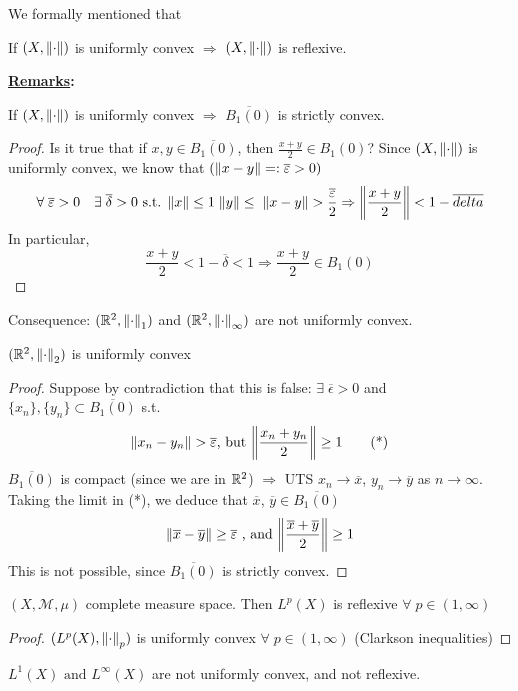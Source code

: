 We formally mentioned that
\begin{theorem}
    If \((X, \norm{\cdot})\) is uniformly convex \(\Rightarrow\) \((X, \norm{\cdot})\) is reflexive.
\end{theorem}

\noindent\textbf{\underline{Remarks}:}
    \begin{proposition}
        If \((X, \norm{\cdot})\) is uniformly convex \(\Rightarrow\) \(\overline{B_1(0)}\) is strictly convex.
    \end{proposition}
    \begin{proof}
        Is it true that if \(x, y \in \overline{B_1(0)}\), then \(\frac{x+y}{2} \in B_1(0)\)? Since \((X, \norm{\cdot})\) is uniformly convex, we know that \((\norm{x-y}=: \overline{\varepsilon}>0)\)
        \[
            \forall \; \overline{\varepsilon}>0 \quad \exists \; \overline{\delta} >0 \text{ s.t. } \norm{x} \leq 1 \; \norm{y} \leq \; \norm{x-y} > \frac{\overline{\varepsilon}}{2} \Rightarrow \norm{\frac{x+y}{2}} < 1-\overline{delta} 
        \]
        In particular, 
        \[
            \frac{x+y}{2} < 1-\overline{\delta} < 1 \Rightarrow \frac{x+y}{2} \in B_1(0)
        \] 
    \end{proof}
    Consequence: \((\mathbb{R}^2, \norm{\cdot}_1)\) and \((\mathbb{R}^2, \norm{\cdot}_\infty)\) are not uniformly convex.
\begin{proposition}
    \((\mathbb{R}^2, \norm{\cdot}_2)\) is uniformly convex
\end{proposition}
\begin{proof}
    Suppose by contradiction that this is false:
    \( \exists \; \overline{\epsilon} >0 \) and \( \{x_n\}, \{y_n\} \subset \overline{B_1(0)} \) s.t. 
    \[
        \norm{x_n - y_n} > \overline{\varepsilon} \text{, but } \norm{\frac{x_n + y_n}{2}} \geq 1 \tag{*}
    \]
    \(\overline{B_1(0)}\) is compact (since we are in \(\mathbb{R}^2\)) \(\Rightarrow\) UTS \(x_n \to \overline{x} \), \(y_n \to \overline{y}\) as \(n \to\infty\). Taking the limit in (*), we deduce that \(\overline{x}\), \(\overline{y} \in \overline{B_1(0)}\)
    \[
        \norm{\overline{x}- \overline{y}} \geq \overline{\varepsilon} \text{ , and } \norm{\frac{\overline{x}+\overline{y}}{2}} \geq 1
    \]
    This is not possible, since \(\overline{B_1(0)}\) is strictly convex.
\end{proof}

\begin{theorem}
    \((X, \mathcal{M}, \mu)\) complete measure space. Then \(L^{p}(X)\) is reflexive \(\forall \; p \in (1, \infty)\)
\end{theorem}
\begin{proof}
    \((L^p(X), \norm{\cdot}_p)\) is uniformly convex \(\forall \; p \in (1, \infty)\) (Clarkson inequalities)
\end{proof}
\(L^1(X) \text{ and } L^\infty(X)\) are not uniformly convex, and not reflexive.

